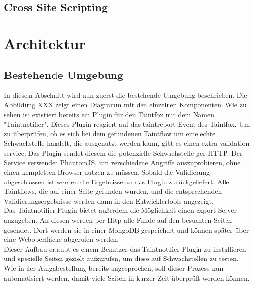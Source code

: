 \section{Cross Site Scripting}
\chapter{Architektur}
\section{Bestehende Umgebung}
In diesem Abschnitt wird nun zuerst die bestehende Umgebung beschrieben. Die Abbildung XXX zeigt einen Diagramm mit den einzelnen Komponenten. Wie zu sehen ist existiert bereits ein Plugin für den Taintfox mit dem Namen "Taintnotifier". Dieses Plugin reagiert auf das taintreport Event des Taintfox. Um zu überprüfen, ob es sich bei dem gefundenen Taintflow um eine echte Schwachstelle handelt, die ausgenutzt werden kann, gibt es einen extra validation service. Das Plugin sendet diesem die potenzielle Schwachstelle per HTTP. Der Service verwendet PhantomJS, um verschiedene Angriffe auszuprobieren, ohne einen kompletten Browser nutzen zu müssen. Sobald die Validierung abgeschlossen ist werden die Ergebnisse an das Plugin zurückgeliefert. Alle Taintflows, die auf einer Seite gefunden wurden, und die entsprechenden Validierungsergebnisse werden dann in den Entwicklertools angezeigt. \\
Das Taintnotifier Plugin bietet außerdem die Möglichkeit einen export Server anzugeben. An diesen werden per Http alle Funde auf den besuchten Seiten gesendet. Dort werden sie in einer MongoDB gespeichert und können später über eine Weboberfläche abgerufen werden. \\
Dieser Aufbau erlaubt es einem Benutzer das Taintnotifier Plugin zu installieren und spezielle Seiten gezielt aufzurufen, um diese auf Schwachstellen zu testen. Wie in der Aufgabestellung bereits angesprochen, soll dieser Prozess nun automatisiert werden, damit viele Seiten in kurzer Zeit überprüft werden können.
